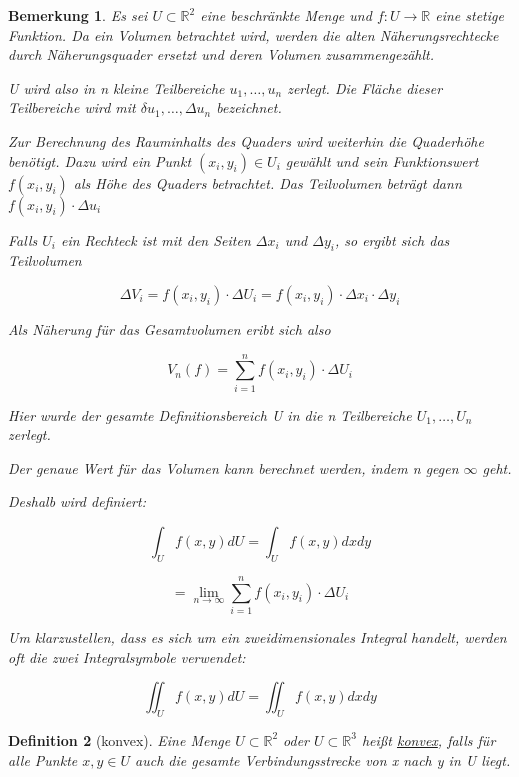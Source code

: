 \documentclass[12pt,a4paper]{scrreprt}
\newtheorem{defi}{Definition}[section]
\newtheorem{bemerkung}[defi]{Bemerkung}
\begin{document}
	\begin{bemerkung}
		Es sei $U\subset \mathbb{R}^2$ eine beschränkte Menge und $f:U\to \mathbb{R}$ eine stetige Funktion. Da ein Volumen betrachtet wird, werden die alten Näherungsrechtecke durch Näherungsquader ersetzt und deren Volumen zusammengezählt.

		U wird also in n kleine Teilbereiche $u_1,\dots,u_n$ zerlegt. Die Fläche dieser Teilbereiche wird mit $\delta u_1,\dots,\Delta u_n$ bezeichnet.

		Zur Berechnung des Rauminhalts des Quaders wird weiterhin die Quaderhöhe benötigt. Dazu wird ein Punkt $(x_i,y_i)\in U_i$ gewählt und sein Funktionswert $f(x_i,y_i)$ als Höhe des Quaders betrachtet. Das Teilvolumen beträgt dann $f(x_i,y_i)\cdot\Delta u_i$

		Falls $U_i$ ein Rechteck ist mit den Seiten $\Delta x_i$ und $\Delta y_i$, so ergibt sich das Teilvolumen
		
		\[\Delta V_i = f(x_i,y_i)\cdot \Delta U_i=f(x_i,y_i)\cdot \Delta x_i\cdot \Delta y_i\]

		Als Näherung für das Gesamtvolumen eribt sich also

		\[V_n(f)=\sum^{n}_{i=1} f(x_i,y_i)\cdot\Delta U_i\]

		Hier wurde der gesamte Definitionsbereich U in die n Teilbereiche $U_1,\dots,U_n$ zerlegt.

		Der genaue Wert für das Volumen kann berechnet werden, indem n gegen $\infty$ geht.

		Deshalb wird definiert:

		\[\int_{U} f(x,y)dU=\int_{U} f(x,y)dxdy\]

		\[= \lim_{n\to\infty} \sum^{n}_{i=1} f(x_i,y_i)\cdot\Delta U_i\]

		Um klarzustellen, dass es sich um ein zweidimensionales Integral handelt, werden oft die zwei Integralsymbole verwendet:

		\[\iint_{U} f(x,y)dU=\iint_{U} f(x,y)dxdy\]
	\end{bemerkung}

	\begin{defi}[konvex]
		Eine Menge $U\subset\mathbb{R}^2$ oder $U\subset\mathbb{R}^3$ heißt \underline{konvex}, falls für alle Punkte $x,y\in U$ auch die gesamte Verbindungsstrecke von x nach y in U liegt.
	\end{defi}
\end{document}
